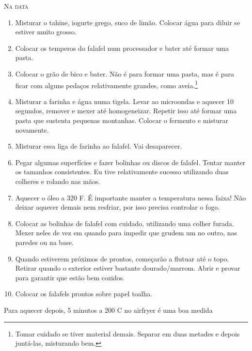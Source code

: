 {  \textsc{Na data}
  \begin{enumerate}
  \item Misturar o tahine, iogurte grego, suco de limão. Colocar água para diluir se estiver muito grosso.
  \item Colocar os temperos do falafel num processador e bater até formar uma pasta.
  \item Colocar o grão de bico e bater. Não é para formar uma pasta, mas é para ficar com alguns pedaços
    relativamente grandes, como aveia.\footnote{Tomar cuidado se tiver material demais. Separar em duas
      metades e depois juntá-las, misturando bem.}
  \item Misturar a farinha e água numa tigela. Levar ao microondas e aquecer 10 segundos, remover e mexer até
    homogeneizar. Repetir isso até formar uma pasta que sustenta pequenas montanhas. Colocar o fermento e
    misturar novamente.
  \item Misturar essa liga de farinha ao falafel. Vai desaparecer.
  \item Pegar algumas superfícies e fazer bolinhas ou discos de falafel. Tentar manter os tamanhos
    consistentes. Eu tive relativamente sucesso utilizando duas colheres e rolando nas mãos.
  \item Aquecer o óleo a 320 \grau F. É importante manter a temperatura nessa faixa! Não deixar aquecer demais
    nem resfriar, por isso precisa controlar o fogo.
  \item Colocar as bolinhas de falafel com cuidado, utilizando uma colher furada. Mexer neles de vez em quando
    para impedir que grudem um no outro, nas paredes ou na base.
  \item Quando estiverem próximos de prontos, começarão a flutuar até o topo. Retirar quando o exterior
    estiver bastante dourado/marrom. Abrir e provar para garantir que estão bem cozidos.
  \item Colocar os falafels prontos sobre papel toalha.
  \end{enumerate}

  Para aquecer depois, 5 minutos a 200 \grau C no airfryer é uma boa medida
}

